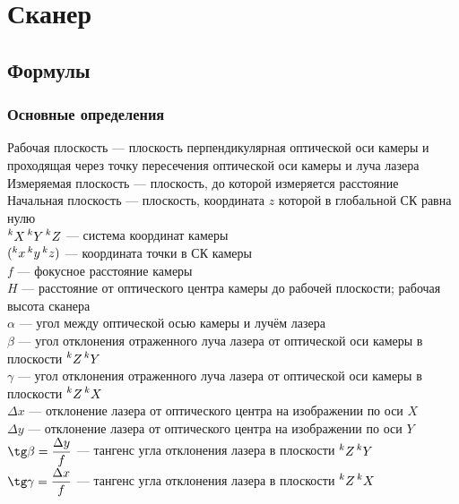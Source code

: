 \documentclass[a4paper, 12pt]{article}
\begin{document}
	\section{Сканер}
		\subsection{Формулы}
			\subsubsection{Основные определения}
				Рабочая плоскость --- плоскость перпендикулярная оптической оси камеры и проходящая через точку пересечения оптической оси камеры и луча лазера\\
				Измеряемая плоскость --- плоскость, до которой измеряется расстояние\\
				Начальная плоскость --- плоскость, координата $z$ которой в глобальной СК равна нулю\\
				$\prescript{k}{}{X} \prescript{k}{}{Y} \prescript{k}{}{Z}$ --- система координат камеры\\
				$(\prescript{k}{}{x} \prescript{k}{}{y} \prescript{k}{}{z})$ --- координата точки в СК камеры\\
				$f$ --- фокусное расстояние камеры\\
				$H$ --- расстояние от оптического центра камеры до рабочей плоскости; рабочая высота сканера\\
				$\alpha$ --- угол между оптической осью камеры и лучём лазера\\
				$\beta$ --- угол отклонения отраженного луча лазера от оптической оси камеры в плоскости $\prescript{k}{}{Z}\prescript{k}{}{Y}$\\
				$\gamma$ --- угол отклонения отраженного луча лазера от оптической оси камеры в плоскости $\prescript{k}{}{Z}\prescript{k}{}{X}$\\
				$\Delta x$ --- отклонение лазера от оптического центра на изображении по оси $X$\\
				$\Delta y$ --- отклонение лазера от оптического центра на изображении по оси $Y$\\
				$\tg\beta = \dfrac{\Delta y}{f}$ --- тангенс угла отклонения лазера в плоскости $\prescript{k}{}{Z}\prescript{k}{}{Y}$\\
				$\tg\gamma = \dfrac{\Delta x}{f}$ --- тангенс угла отклонения лазера в плоскости $\prescript{k}{}{Z}\prescript{k}{}{X}$\\
\end{document}

